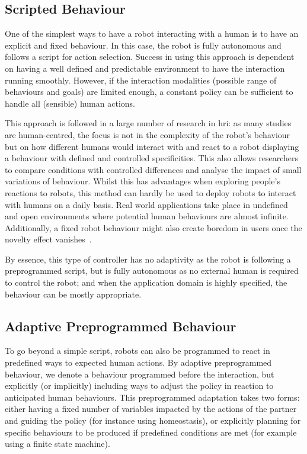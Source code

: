 \subsection{Scripted Behaviour}

    One of the simplest ways to have a robot interacting with a human is to have an explicit and fixed behaviour. In this case, the robot is fully autonomous and follows a script for action selection. Success in using this approach is dependent on having a well defined and predictable environment to have the interaction running smoothly. However, if the interaction modalities (possible range of behaviours and goals) are limited enough, a constant policy can be sufficient to handle all (sensible) human actions. 
    
    This approach is followed in a large number of research in \gls{hri}: as many studies are human-centred, the focus is not in the complexity of the robot's behaviour but on how different humans would interact with and react to a robot displaying a behaviour with defined and controlled specificities. This also allows researchers to compare conditions with controlled differences and analyse the impact of small variations of behaviour. Whilst this has advantages when exploring people's reactions to robots, this method can hardly be used to deploy robots to interact with humans on a daily basis. Real world applications take place in undefined and open environments where potential human behaviours are almost infinite. Additionally, a fixed robot behaviour might also create boredom in users once the novelty effect vanishes~\citep{salter2004robots}.
  
    By essence, this type of controller has no adaptivity as the robot is following a preprogrammed script, but is fully autonomous as no external human is required to control the robot; and when the application domain is highly specified, the behaviour can be mostly appropriate.

\subsection{Adaptive Preprogrammed Behaviour}
	
	To go beyond a simple script, robots can also be programmed to react in predefined ways to expected human actions. By adaptive preprogrammed behaviour, we denote a behaviour programmed before the interaction, but explicitly (or implicitly) including ways to adjust the policy in reaction to anticipated human behaviours. This preprogrammed adaptation takes two forms: either having a fixed number of variables impacted by the actions of the partner and guiding the policy (for instance using homeostasis), or explicitly planning for specific behaviours to be produced if predefined conditions are met (for example using a finite state machine).
	
